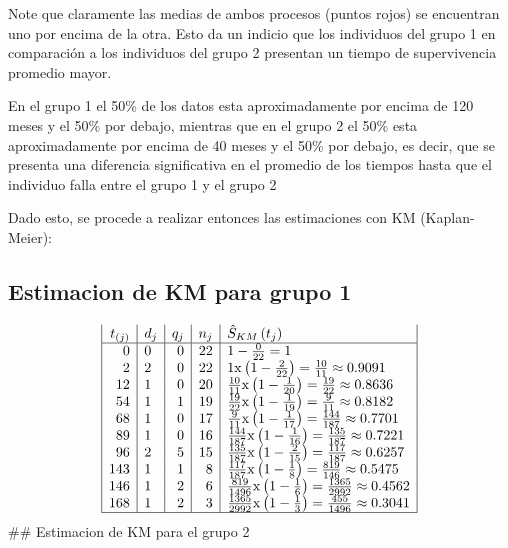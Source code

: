 \documentclass[
  12pt,
  letterpaper,
]{article}
\begin{document}
Note que claramente las medias de ambos procesos (puntos rojos) se
encuentran uno por encima de la otra. Esto da un indicio que los
individuos del grupo 1 en comparación a los individuos del grupo 2
presentan un tiempo de supervivencia promedio mayor.

En el grupo 1 el 50\% de los datos esta aproximadamente por encima de
120 meses y el 50\% por debajo, mientras que en el grupo 2 el 50\% esta
aproximadamente por encima de 40 meses y el 50\% por debajo, es decir,
que se presenta una diferencia significativa en el promedio de los
tiempos hasta que el individuo falla entre el grupo 1 y el grupo 2

Dado esto, se procede a realizar entonces las estimaciones con KM
(Kaplan-Meier):

\hypertarget{estimacion-de-km-para-grupo-1}{%
\subsection{Estimacion de KM para grupo
1}\label{estimacion-de-km-para-grupo-1}}

\[
\begin{array}{|r|l|r|r|l|}
t_{(j)} & d_j & q_j & n_j & \hat{S}_{K M}\left(t_j\right) \\
\hline 0 & 0 & 0 & 22 & 1-\frac{0}{22}=1 \\
2 & 2 & 0 & 22 & 1 \mathrm{x}\left(1-\frac{2}{22}\right)=\frac{10}{11} \approx 0.9091 \\
12 & 1 & 0 & 20 & \frac{10}{11} \mathrm{x}\left(1-\frac{1}{20}\right)=\frac{19}{22} \approx 0.8636 \\
54 & 1 & 1 & 19 & \frac{19}{22} \mathrm{x}\left(1-\frac{1}{19}\right)=\frac{9}{11} \approx 0.8182 \\
68 & 1 & 0 & 17 & \frac{9}{11} \mathrm{x}\left(1-\frac{1}{17}\right)=\frac{144}{187} \approx 0.7701 \\
89 & 1 & 0 & 16 & \frac{144}{187} \mathrm{x}\left(1-\frac{1}{16}\right)=\frac{135}{187} \approx 0.7221 \\
96 & 2 & 5 & 15 & \frac{135}{187} \mathrm{x}\left(1-\frac{2}{15}\right)=\frac{117}{187} \approx 0.6257 \\
143 & 1 & 1 & 8 & \frac{117}{187} \mathrm{x}\left(1-\frac{1}{8}\right)=\frac{819}{146} \approx 0.5475 \\
146 & 1 & 2 & 6 & \frac{819}{1496} \mathrm{x}\left(1-\frac{1}{6}\right)=\frac{1365}{2992} \approx 0.4562 \\
168 & 1 & 2 & 3 & \frac{1365}{2992} \mathrm{x}\left(1-\frac{1}{3}\right)=\frac{455}{1496} \approx 0.3041 \\
\hline
\end{array}
\] \#\# Estimacion de KM para el grupo 2
\end{document}
